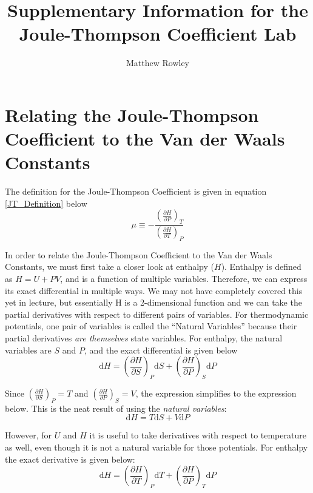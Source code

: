 \documentclass[12pt,letterpaper]{article}
\title{Supplementary Information for the Joule-Thompson Coefficient Lab}
\author{Matthew Rowley}
\begin{document}
	\maketitle
	\section{Relating the Joule-Thompson Coefficient to the Van der Waals Constants}
	The definition for the Joule-Thompson Coefficient is given in equation \ref{JT_Definition} below
	\begin{equation}\label{JT_Definition}
		\mu\equiv-\frac{\left(\frac{\partial H}{\partial P}\right)_T}{\left(\frac{\partial H}{\partial T}\right)_P}
	\end{equation}

	In order to relate the Joule-Thompson Coefficient to the Van der Waals Constants, we must first take a closer look at enthalpy ($H$). Enthalpy is defined as $H=U+PV$, and is a function of multiple variables. Therefore, we can express its exact differential in multiple ways. We may not have completely covered this yet in lecture, but essentially H is a 2-dimensional function and we can take the partial derivatives with respect to different pairs of variables. For thermodynamic potentials, one pair of variables is called the ``Natural Variables'' because their partial derivatives \emph{are themselves} state variables. For enthalpy, the natural variables are $S$ and $P$, and the exact differential is given below
	\begin{equation}
		\mathrm{d}H=\left(\frac{\partial H}{\partial S}\right)_P\mathrm{d}S + \left(\frac{\partial H}{\partial P}\right)_S\mathrm{d}P
	\end{equation}

	Since $\left(\frac{\partial H}{\partial S}\right)_P=T$ and $\left(\frac{\partial H}{\partial P}\right)_S=V$, the expression simplifies to the expression below. This is the neat result of using the \emph{natural variables}:
	\begin{equation}\label{natural}
		\mathrm{d}H=T\mathrm{d}S + V\mathrm{d}P
	\end{equation}

	However, for $U$ and $H$ it is useful to take derivatives with respect to temperature as well, even though it is not a natural variable for those potentials. For enthalpy the exact derivative is given below:
	\begin{equation}
		\mathrm{d}H=\left(\frac{\partial H}{\partial T}\right)_P\mathrm{d}T + \left(\frac{\partial H}{\partial P}\right)_T\mathrm{d}P
	\end{equation}
\end{document}
